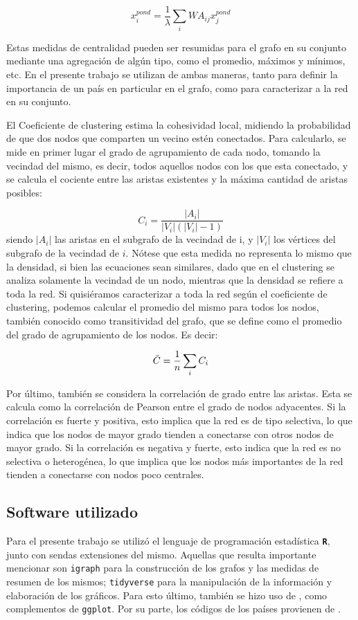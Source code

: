 \documentclass[a4paper]{article}
\begin{document}
$$
x_i^{pond}=\frac{1}{\lambda}  \sum_{i} WA_{ij}x_{j}^{pond}
$$

Estas medidas de centralidad pueden ser resumidas para el grafo en su conjunto mediante una agregación de algún tipo, como el promedio, máximos y mínimos, etc. En el presente trabajo se utilizan de ambas maneras, tanto para definir la importancia de un país en particular en el grafo, como para caracterizar a la red en su conjunto.
\par

El Coeficiente de clustering estima la cohesividad local, midiendo la probabilidad de que dos nodos que comparten un vecino estén conectados. Para calcularlo, se mide en primer lugar el grado de agrupamiento de cada nodo, tomando la vecindad del mismo, es decir, todos aquellos nodos con los que esta conectado, y se calcula el cociente entre las aristas existentes y la máxima cantidad de aristas posibles:

$$
C_i = \frac{|A_i|}{|V_i|(|V_i|-1)}
$$
siendo $|A_i|$ las aristas en el subgrafo de la vecindad de i, y $|V_i|$ los vértices del subgrafo de la vecindad de $i$. Nótese que esta medida no representa lo mismo que la densidad, si bien las ecuaciones sean similares, dado que en el clustering se analiza solamente la vecindad de un nodo, mientras que la densidad se refiere a toda la red.
Si quisiéramos caracterizar a toda la red según el coeficiente de clustering, podemos calcular el promedio del mismo para todos los nodos, también conocido como transitividad del grafo, que se define como el promedio del grado de agrupamiento de los nodos. Es decir:

$$
\Bar{C} = \frac{1}{n} \sum_{i} C_{i}
$$ 


Por último, también se considera la correlación de grado entre las aristas. Esta se calcula como la correlación de Pearson entre el grado de nodos adyacentes. Si la correlación es fuerte y positiva, esto implica que la red es de tipo selectiva, lo que indica que los nodos de mayor grado tienden a conectarse con otros nodos de mayor grado. Si la correlación es negativa y fuerte, esto indica que la red es no selectiva o heterogénea, lo que implica que los nodos más importantes de la red tienden a conectarse con nodos poco centrales. 


\subsection{Software utilizado}

Para el presente trabajo se utilizó el lenguaje de programación estadística \texttt{\textbf{R}}\cite{RCoreTeam2017}, junto con sendas extensiones del mismo. Aquellas que resulta importante mencionar son \texttt{igraph}\cite{Csardi2006} para la construcción de los grafos y las medidas de resumen de los mismos; \texttt{tidyverse}\cite{Wickham2017} para la manipulación de la información y elaboración de los gráficos. Para esto último, también se hizo uso de  \cite{Wilke2017,Arnold2017,Neuwirth2014,Slowikowski2017,Vu2011}, como complementos de \texttt{ggplot}. Por su parte, los códigos de los países provienen de \cite{Arel-Bundock2017}.
\end{document}
